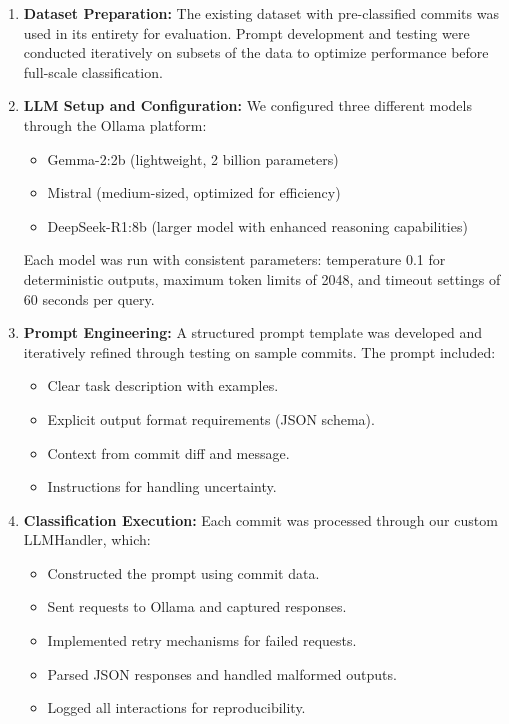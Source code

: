 \begin{enumerate}
    \item \textbf{Dataset Preparation:} The existing dataset with pre-classified commits was used in its entirety for evaluation. Prompt development and testing were conducted iteratively on subsets of the data to optimize performance before full-scale classification.
    
    \item \textbf{LLM Setup and Configuration:} We configured three different models through the Ollama platform:
    \begin{itemize}
        \item Gemma-2:2b (lightweight, 2 billion parameters)
        \item Mistral (medium-sized, optimized for efficiency)
        \item DeepSeek-R1:8b (larger model with enhanced reasoning capabilities)
    \end{itemize}
    Each model was run with consistent parameters: temperature 0.1 for deterministic outputs, maximum token limits of 2048, and timeout settings of 60 seconds per query.
    
    \item \textbf{Prompt Engineering:} A structured prompt template was developed and iteratively refined through testing on sample commits. The prompt included:
    \begin{itemize}
        \item Clear task description with examples.
        \item Explicit output format requirements (JSON schema).
        \item Context from commit diff and message.
        \item Instructions for handling uncertainty.
    \end{itemize}
    
    \item \textbf{Classification Execution:} Each commit was processed through our custom LLMHandler, which:
    \begin{itemize}
        \item Constructed the prompt using commit data.
        \item Sent requests to Ollama and captured responses.
        \item Implemented retry mechanisms for failed requests.
        \item Parsed JSON responses and handled malformed outputs.
        \item Logged all interactions for reproducibility.
    \end{itemize}
    

\end{enumerate}

